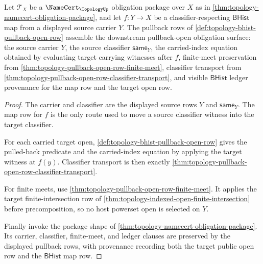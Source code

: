 \begin{theorem}
\label{thm:topology-pullback-namecert-obligation-surface}
Let $\mathcal{T}_X$ be a $\NameCert_{\TopologyUp}$ obligation package over $X$ as in \autoref{thm:topology-namecert-obligation-package}, and let $f:Y\to X$ be a classifier-respecting $\mathsf{BHist}$ map from a displayed source carrier $Y$. The pullback rows of \autoref{def:topology-bhist-pullback-open-row} assemble the downstream pullback-open obligation surface: the source carrier $Y$, the source classifier $\mathsf{same}_Y$, the carried-index equation obtained by evaluating target carrying witnesses after $f$, finite-meet preservation from \autoref{thm:topology-pullback-open-row-finite-meet}, classifier transport from \autoref{thm:topology-pullback-open-row-classifier-transport}, and visible $\mathsf{BHist}$ ledger provenance for the map row and the target open row.
\end{theorem}
\begin{proof}
The carrier and classifier are the displayed source rows $Y$ and $\mathsf{same}_Y$. The map row for $f$ is the only route used to move a source classifier witness into the target classifier.

For each carried target open, \autoref{def:topology-bhist-pullback-open-row} gives the pulled-back predicate and the carried-index equation by applying the target witness at $f(y)$. Classifier transport is then exactly \autoref{thm:topology-pullback-open-row-classifier-transport}.

For finite meets, use \autoref{thm:topology-pullback-open-row-finite-meet}. It applies the target finite-intersection row of \autoref{thm:topology-indexed-open-finite-intersection} before precomposition, so no host powerset open is selected on $Y$.

Finally invoke the package shape of \autoref{thm:topology-namecert-obligation-package}. Its carrier, classifier, finite-meet, and ledger clauses are preserved by the displayed pullback rows, with provenance recording both the target public open row and the $\mathsf{BHist}$ map row.
\end{proof}

